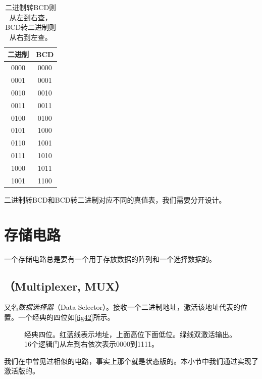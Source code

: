 \begin{table}[!ht]
  \centering
  \begin{tabular}{|c|c|}
    \hline
    二进制 & BCD \\\hline
    0000   & 0000 \\\hline
    0001   & 0001 \\\hline
    0010   & 0010 \\\hline
    0011   & 0011 \\\hline
    0100   & 0100 \\\hline
    0101   & 1000 \\\hline
    0110   & 1001 \\\hline
    0111   & 1010 \\\hline
    1000   & 1011 \\\hline
    1001   & 1100 \\\hline
  \end{tabular}
  \caption{二进制转BCD则从左到右查，BCD转二进制则从右到左查。}\label{tab12}
\end{table}

二进制转BCD和BCD转二进制对应不同的真值表，我们需要分开设计。

\section{存储电路}
一个存储电路总是要有一个用于存放数据的阵列和一个选择数据的\termMUX 。

\subsection{\termMUX （Multiplexer, MUX）}
\emph{\termMUX}又名\emph{数据选择器}（Data Selector）。\termMUX 接收一个二进制地址，激活该地址代表的位置。一个经典的四位\termMUX 如\autoref{fig42}所示。

\begin{figure}[!ht]
  \centering
  \caption{经典四位\termMUX。红蓝线表示地址，上面高位下面低位。绿线双激活输出。16个逻辑门从左到右依次表示0000到1111。}\label{fig42}
\end{figure}

我们在中曾见过相似的电路，事实上那个就是状态版的\termMUX 。本小节中我们通过实现了激活版的\termMUX 。

